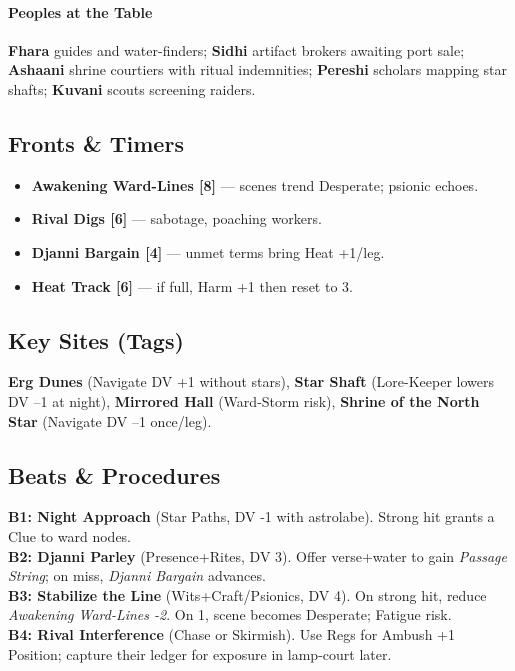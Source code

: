 \documentclass[11pt]{article}
\begin{document}
\paragraph{Peoples at the Table}
\textbf{Fhara} guides and water-finders; \textbf{Sidhi} artifact brokers awaiting port sale; \textbf{Ashaani} shrine courtiers with ritual indemnities; \textbf{Pereshi} scholars mapping star shafts; \textbf{Kuvani} scouts screening raiders.

\subsection*{Fronts \& Timers}
\begin{itemize}
  \item \textbf{Awakening Ward-Lines [8]} --- scenes trend Desperate; psionic echoes.
  \item \textbf{Rival Digs [6]} --- sabotage, poaching workers.
  \item \textbf{Djanni Bargain [4]} --- unmet terms bring Heat +1/leg.
  \item \textbf{Heat Track [6]} --- if full, Harm +1 then reset to 3.
\end{itemize}

\subsection*{Key Sites (Tags)}
\textbf{Erg Dunes} (Navigate DV +1 without stars), 
\textbf{Star Shaft} (Lore-Keeper lowers DV --1 at night), 
\textbf{Mirrored Hall} (Ward-Storm risk), 
\textbf{Shrine of the North Star} (Navigate DV --1 once/leg).

\subsection*{Beats \& Procedures}
\textbf{B1: Night Approach} (Star Paths, DV -1 with astrolabe). Strong hit grants a Clue to ward nodes. \\
\textbf{B2: Djanni Parley} (Presence+Rites, DV 3). Offer verse+water to gain \emph{Passage String}; on miss, \emph{Djanni Bargain} advances. \\
\textbf{B3: Stabilize the Line} (Wits+Craft/Psionics, DV 4). On strong hit, reduce \emph{Awakening Ward-Lines -2}. On 1, scene becomes Desperate; Fatigue risk. \\
\textbf{B4: Rival Interference} (Chase or Skirmish). Use Regs for Ambush +1 Position; capture their ledger for exposure in lamp-court later.
\end{document}
